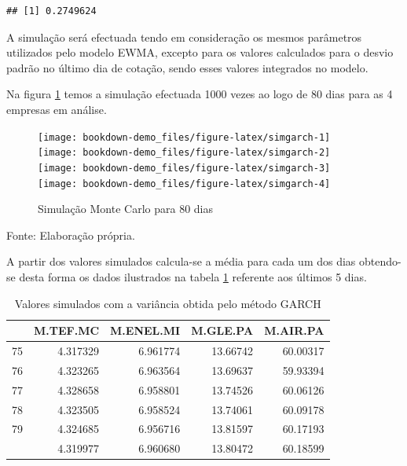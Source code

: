 \documentclass[
  12pt,
  a4paper,
  openany]{book}
\theoremstyle{definition}
\theoremstyle{definition}
\theoremstyle{definition}
\theoremstyle{remark}
\begin{document}
\begin{verbatim}
## [1] 0.2749624
\end{verbatim}

A simulação será efectuada tendo em consideração os mesmos parâmetros utilizados pelo modelo EWMA, excepto para os valores calculados para o desvio padrão no último dia de cotação, sendo esses valores integrados no modelo.

Na figura \ref{fig:simgarch} temos a simulação efectuada 1000 vezes ao logo de 80 dias para as 4 empresas em análise.

\begin{figure}

{\centering \texttt{[image: bookdown-demo\_files/figure-latex/simgarch-1]} \texttt{[image: bookdown-demo\_files/figure-latex/simgarch-2]} \texttt{[image: bookdown-demo\_files/figure-latex/simgarch-3]} \texttt{[image: bookdown-demo\_files/figure-latex/simgarch-4]} 

}

\caption{Simulação Monte Carlo para 80 dias}\label{fig:simgarch}
\end{figure}
\FloatBarrier
\centering

Fonte: Elaboração própria.

\justifying
\bigskip

A partir dos valores simulados calcula-se a média para cada um dos dias obtendo-se desta forma os dados ilustrados na tabela \ref{tab:simtabgarch} referente aos últimos 5 dias.

\begin{table}[!h]

\caption{\label{tab:simtabgarch}Valores simulados com a variância obtida pelo método GARCH}
\centering
\begin{tabular}[t]{lrrrr}
\toprule
  & M.TEF.MC & M.ENEL.MI & M.GLE.PA & M.AIR.PA\\
\midrule
75 & 4.317329 & 6.961774 & 13.66742 & 60.00317\\
76 & 4.323265 & 6.963564 & 13.69637 & 59.93394\\
77 & 4.328658 & 6.958801 & 13.74526 & 60.06126\\
78 & 4.323505 & 6.958524 & 13.74061 & 60.09178\\
79 & 4.324685 & 6.956716 & 13.81597 & 60.17193\\
\addlinespace
80 & 4.319977 & 6.960680 & 13.80472 & 60.18599\\
\bottomrule
\end{tabular}
\end{table}
\FloatBarrier
\centering
\end{document}
